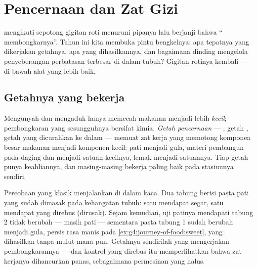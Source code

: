 \chapter{Pencernaan dan Zat Gizi}\label{ch:g7:digestion-and-nutrients}

 mengikuti sepotong gigitan roti menuruni
pipanya lalu berjanji bahwa `` membongkarnya''. Tahun
ini kita membuka pintu bengkelnya: apa tepatnya yang dikerjakan
getahnya, apa  yang dihasilkannya, dan bagaimana dinding  mengelola penyeberangan perbatasan terbesar di dalam tubuh?
Gigitan rotinya kembali --- di bawah alat yang lebih baik.

\section{Getahnya yang bekerja}

\begin{proposition}\label{prop:g7:digestion-and-nutrients:chemical}
Mengunyah dan mengaduk hanya memecah makanan menjadi lebih
\emph{kecil}; pembongkaran yang sesungguhnya bersifat kimia.
\emph{Getah pencernaan} --- , getah
, getah yang dicurahkan ke dalam  --- memuat zat
kerja yang memotong komponen besar makanan menjadi komponen kecil:
pati menjadi gula, materi pembangun pada daging dan  menjadi
satuan kecilnya, lemak menjadi satuannya. Tiap getah punya
keahliannya, dan masing-masing bekerja paling baik pada 
stasiunnya sendiri.
\end{proposition}
\admitted

\begin{example}\label{ex:g7:digestion-and-nutrients:bench}
Percobaan yang klasik menjalankan  di dalam kaca. Dua tabung
berisi pasta pati yang sudah dimasak pada kehangatan tubuh: satu
mendapat  segar, satu mendapat  yang direbus (dirusak).
Sejam kemudian, uji patinya mendapati tabung 2 tidak berubah --- masih
pati --- sementara pasta tabung 1 sudah berubah menjadi gula, persis
rasa manis pada \cref{ex:g4:journey-of-food:sweet}, yang dihasilkan
tanpa mulut mana pun. Getahnya sendirilah yang mengerjakan
pembongkarannya --- dan kontrol yang direbus itu memperlihatkan bahwa
zat kerjanya dihancurkan panas, sebagaimana permesinan yang halus.
\end{example}

